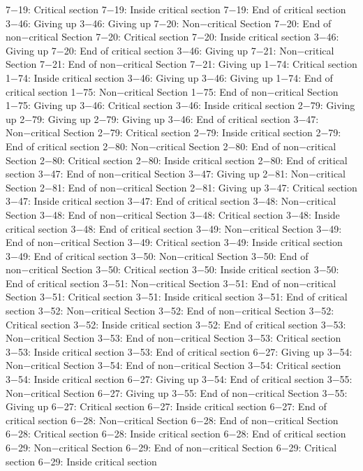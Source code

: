 7−19: Critical section
7−19: Inside critical section
7−19: End of critical section
3−46: Giving up
3−46: Giving up
7−20: Non−critical Section
7−20: End of non−critical Section
7−20: Critical section
7−20: Inside critical section
3−46: Giving up
7−20: End of critical section
3−46: Giving up
7−21: Non−critical Section
7−21: End of non−critical Section
7−21: Giving up
1−74: Critical section
1−74: Inside critical section
3−46: Giving up
3−46: Giving up
1−74: End of critical section
1−75: Non−critical Section
1−75: End of non−critical Section
1−75: Giving up
3−46: Critical section
3−46: Inside critical section
2−79: Giving up
2−79: Giving up
2−79: Giving up
3−46: End of critical section
3−47: Non−critical Section
2−79: Critical section
2−79: Inside critical section
2−79: End of critical section
2−80: Non−critical Section
2−80: End of non−critical Section
2−80: Critical section
2−80: Inside critical section
2−80: End of critical section
3−47: End of non−critical Section
3−47: Giving up
2−81: Non−critical Section
2−81: End of non−critical Section
2−81: Giving up
3−47: Critical section
3−47: Inside critical section
3−47: End of critical section
3−48: Non−critical Section
3−48: End of non−critical Section
3−48: Critical section
3−48: Inside critical section
3−48: End of critical section
3−49: Non−critical Section
3−49: End of non−critical Section
3−49: Critical section
3−49: Inside critical section
3−49: End of critical section
3−50: Non−critical Section
3−50: End of non−critical Section
3−50: Critical section
3−50: Inside critical section
3−50: End of critical section
3−51: Non−critical Section
3−51: End of non−critical Section
3−51: Critical section
3−51: Inside critical section
3−51: End of critical section
3−52: Non−critical Section
3−52: End of non−critical Section
3−52: Critical section
3−52: Inside critical section
3−52: End of critical section
3−53: Non−critical Section
3−53: End of non−critical Section
3−53: Critical section
3−53: Inside critical section
3−53: End of critical section
6−27: Giving up
3−54: Non−critical Section
3−54: End of non−critical Section
3−54: Critical section
3−54: Inside critical section
6−27: Giving up
3−54: End of critical section
3−55: Non−critical Section
6−27: Giving up
3−55: End of non−critical Section
3−55: Giving up
6−27: Critical section
6−27: Inside critical section
6−27: End of critical section
6−28: Non−critical Section
6−28: End of non−critical Section
6−28: Critical section
6−28: Inside critical section
6−28: End of critical section
6−29: Non−critical Section
6−29: End of non−critical Section
6−29: Critical section
6−29: Inside critical section
